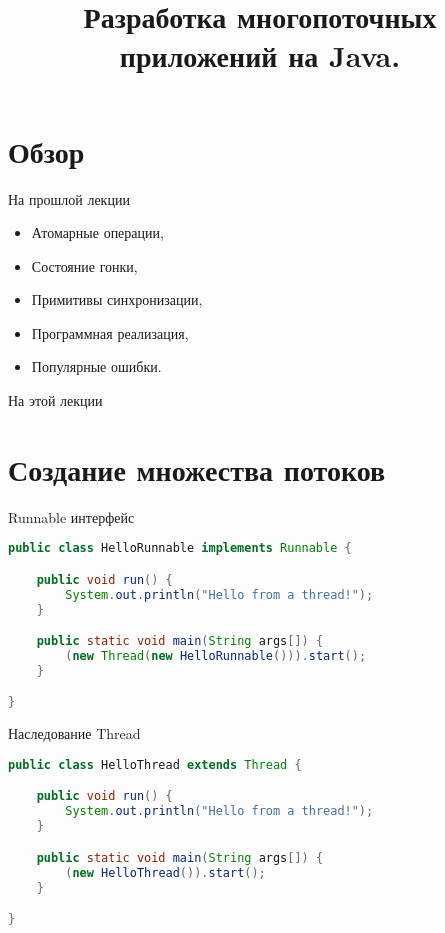 

\title{Разработка многопоточных приложений на Java.}



\begin{frame}
\titlepage
\end{frame}

\section*{Обзор}

\begin{frame}{На прошлой лекции}
\begin{itemize}
\ifsbertech
    \item Атомарные операции,
    \item Состояние гонки,
    \item Примитивы синхронизации,
    \item Программная реализация,
    \item Популярные ошибки.
\fi
\end{itemize}
\end{frame}

\begin{frame}{На этой лекции}
\tableofcontents
\end{frame}

\section{Создание множества потоков}

\begin{frame}[fragile]{Runnable интерфейс}
\begin{lstlisting}[basicstyle=\footnotesize, language=Java]
public class HelloRunnable implements Runnable {

    public void run() {
        System.out.println("Hello from a thread!");
    }

    public static void main(String args[]) {
        (new Thread(new HelloRunnable())).start();
    }

}
\end{lstlisting}
\end{frame}

\begin{frame}[fragile]{Наследование Thread}
\begin{lstlisting}[basicstyle=\footnotesize, language=Java]
public class HelloThread extends Thread {

    public void run() {
        System.out.println("Hello from a thread!");
    }

    public static void main(String args[]) {
        (new HelloThread()).start();
    }

}
\end{lstlisting}
\end{frame}

